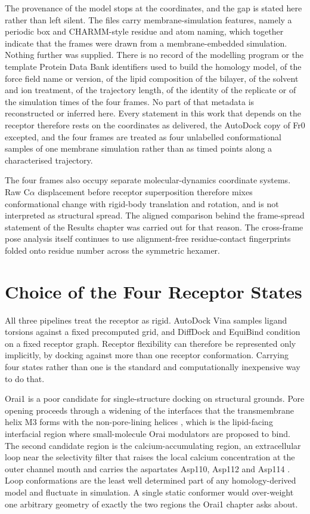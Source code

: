 The provenance of the model stops at the coordinates, and the gap is stated here rather than left silent. The files carry membrane-simulation features, namely a periodic box and CHARMM-style residue and atom naming, which together indicate that the frames were drawn from a membrane-embedded simulation. Nothing further was supplied. There is no record of the modelling program or the template Protein Data Bank identifiers used to build the homology model, of the force field name or version, of the lipid composition of the bilayer, of the solvent and ion treatment, of the trajectory length, of the identity of the replicate or of the simulation times of the four frames. No part of that metadata is reconstructed or inferred here. Every statement in this work that depends on the receptor therefore rests on the coordinates as delivered, the AutoDock copy of Fr0 excepted, and the four frames are treated as four unlabelled conformational samples of one membrane simulation rather than as timed points along a characterised trajectory.

The four frames also occupy separate molecular-dynamics coordinate systems. Raw C\ensuremath{\alpha} displacement before receptor superposition therefore mixes conformational change with rigid-body translation and rotation, and is not interpreted as structural spread. The aligned comparison behind the frame-spread statement of the Results chapter was carried out for that reason. The cross-frame pose analysis itself continues to use alignment-free residue-contact fingerprints folded onto residue number across the symmetric hexamer.

\hypertarget{choice-of-the-four-receptor-states}{%
\section{Choice of the Four Receptor States}\label{choice-of-the-four-receptor-states}}

All three pipelines treat the receptor as rigid. AutoDock Vina samples ligand torsions against a fixed precomputed grid, and DiffDock and EquiBind condition on a fixed receptor graph. Receptor flexibility can therefore be represented only implicitly, by docking against more than one receptor conformation. Carrying four states rather than one is the standard and computationally inexpensive way to do that.

Orai1 is a poor candidate for single-structure docking on structural grounds. Pore opening proceeds through a widening of the interfaces that the transmembrane helix M3 forms with the non-pore-lining helices \cite{ref072}, which is the lipid-facing interfacial region where small-molecule Orai modulators are proposed to bind. The second candidate region is the calcium-accumulating region, an extracellular loop near the selectivity filter that raises the local calcium concentration at the outer channel mouth and carries the aspartates Asp110, Asp112 and Asp114 \cite{ref038}. Loop conformations are the least well determined part of any homology-derived model and fluctuate in simulation. A single static conformer would over-weight one arbitrary geometry of exactly the two regions the Orai1 chapter asks about.

